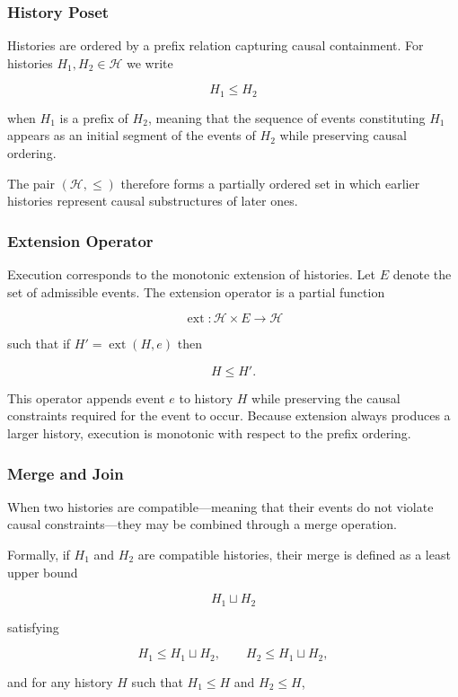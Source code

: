\documentclass[12pt]{article}
\begin{document}
\subsubsection{History Poset}

Histories are ordered by a prefix relation capturing causal
containment. For histories $H_1, H_2 \in \mathcal{H}$ we write

\[
H_1 \leq H_2
\]

when $H_1$ is a prefix of $H_2$, meaning that the sequence
of events constituting $H_1$ appears as an initial segment
of the events of $H_2$ while preserving causal ordering.

The pair $(\mathcal{H}, \leq)$ therefore forms a partially
ordered set in which earlier histories represent causal
substructures of later ones.

\subsubsection{Extension Operator}

Execution corresponds to the monotonic extension of histories.
Let $E$ denote the set of admissible events. The extension
operator is a partial function

\[
\operatorname{ext} : \mathcal{H} \times E \rightarrow \mathcal{H}
\]

such that if $H' = \operatorname{ext}(H, e)$ then

\[
H \leq H'.
\]

This operator appends event $e$ to history $H$ while
preserving the causal constraints required for the event
to occur. Because extension always produces a larger
history, execution is monotonic with respect to the
prefix ordering.

\subsubsection{Merge and Join}

When two histories are compatible—meaning that their
events do not violate causal constraints—they may be
combined through a merge operation.

Formally, if $H_1$ and $H_2$ are compatible histories,
their merge is defined as a least upper bound

\[
H_1 \sqcup H_2
\]

satisfying

\[
H_1 \leq H_1 \sqcup H_2, \qquad
H_2 \leq H_1 \sqcup H_2,
\]

and for any history $H$ such that
$H_1 \leq H$ and $H_2 \leq H$,
\end{document}
